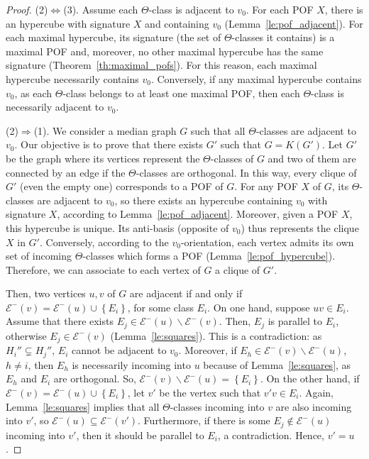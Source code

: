 \documentclass[a4paper,UKenglish,numberwithinsect,cleveref, autoref]{lipics-v2021}
\newcommand{\set}[1]{\left\{ #1 \right\}}
\begin{document}
\begin{proof}
(2)$\Leftrightarrow$(3). Assume each $\Theta$-class is adjacent to $v_0$. For each POF $X$, there is an hypercube with signature $X$ and containing $v_0$ (Lemma~\ref{le:pof_adjacent}). For each maximal hypercube, its signature (the set of $\Theta$-classes it contains) is a maximal POF and, moreover, no other maximal hypercube has the same signature (Theorem~\ref{th:maximal_pofs}). For this reason, each maximal hypercube necessarily contains $v_0$. 
Conversely, if any maximal hypercube contains $v_0$, as each $\Theta$-class belongs to at least one maximal POF, then each $\Theta$-class is necessarily adjacent to $v_0$.

(2)$\Rightarrow$(1). We consider a median graph $G$ such that all $\Theta$-classes are adjacent to $v_0$. Our objective is to prove that there exists $G'$ such that $G = K(G')$. Let $G'$ be the graph where its vertices represent the $\Theta$-classes of $G$ and two of them are connected by an edge if the $\Theta$-classes are orthogonal. In this way, every clique of $G'$ (even the empty one) corresponds to a POF of $G$. For any POF $X$ of $G$, its $\Theta$-classes are adjacent to $v_0$, so there exists an hypercube containing $v_0$ with signature $X$, according to Lemma~\ref{le:pof_adjacent}. Moreover, given a POF $X$, this hypercube is unique. Its anti-basis (opposite of $v_0$) thus represents the clique $X$ in $G'$. Conversely, according to the $v_0$-orientation, each vertex admits its own set of incoming $\Theta$-classes which forms a POF (Lemma~\ref{le:pof_hypercube}). Therefore, we can associate to each vertex of $G$ a clique of $G'$. 

Then, two vertices $u,v$ of $G$ are adjacent if and only if $\mathcal{E}^-(v) = \mathcal{E}^-(u) \cup \set{E_i}$, for some class $E_i$. On one hand, suppose $uv \in E_i$. Assume that there exists $E_j \in \mathcal{E}^-(u) \backslash \mathcal{E}^-(v)$. Then, $E_j$ is parallel to $E_i$, otherwise $E_j \in \mathcal{E}^-(v)$ (Lemma~\ref{le:squares}). This is a contradiction: as $H_i'' \subsetneq H_j''$, $E_i$ cannot be adjacent to $v_0$. Moreover, if $E_h \in \mathcal{E}^-(v) \backslash \mathcal{E}^-(u)$, $h \neq i$, then $E_h$ is necessarily incoming into $u$ because of Lemma~\ref{le:squares}, as $E_h$ and $E_i$ are orthogonal. So, $\mathcal{E}^-(v) \backslash \mathcal{E}^-(u) = \set{E_i}$. On the other hand, if $\mathcal{E}^-(v) = \mathcal{E}^-(u) \cup \set{E_i}$, let $v'$ be the vertex such that $v'v \in E_i$. Again, Lemma~\ref{le:squares} implies that all $\Theta$-classes incoming into $v$ are also incoming into $v'$, so $\mathcal{E}^-(u) \subseteq \mathcal{E}^-(v')$. Furthermore, if there is some $E_j \notin \mathcal{E}^-(u)$ incoming into $v'$, then it should be parallel to $E_i$, a contradiction. Hence, $v' = u$.


\end{proof}
\end{document}

